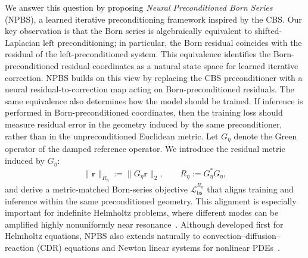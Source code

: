 \documentclass{article}
\theoremstyle{plain}
\theoremstyle{remark}
\begin{document}
We answer this question by proposing \emph{Neural Preconditioned Born Series} (NPBS), a learned iterative preconditioning framework inspired by the CBS.
Our key observation is that the Born series is algebraically equivalent to shifted-Laplacian left preconditioning; in particular, the Born residual coincides with the residual of the left-preconditioned system.
This equivalence identifies the Born-preconditioned residual coordinates as a natural state space for learned iterative correction.
NPBS builds on this view by replacing the CBS preconditioner with a neural residual-to-correction map acting on Born-preconditioned residuals.
The same equivalence also determines how the model should be trained.
If inference is performed in Born-preconditioned coordinates, then the training loss should measure residual error in the geometry induced by the same preconditioner, rather than in the unpreconditioned Euclidean metric.
Let $G_\eta$ denote the Green operator of the damped reference operator.
We introduce the residual metric induced by $G_\eta$:
\begin{equation}
\|\bm r\|_{R_\eta} := \|G_\eta \bm r\|_2,
\qquad
R_\eta := G_\eta^\ast G_\eta,
\end{equation}
and derive a metric-matched Born-series objective $\mathcal{L}_{\mathrm{bs}}^{R_\eta}$ that aligns training and inference within the same preconditioned geometry.
This alignment is especially important for indefinite Helmholtz problems, where different modes can be amplified highly nonuniformly near resonance~\cite{ernst2011difficult,erlangga2004class}.
Although developed first for Helmholtz equations, NPBS also extends naturally to convection--diffusion--reaction (CDR) equations and Newton linear systems for nonlinear PDEs~\cite{hao2024newton,lee2025neural}.
\end{document}
